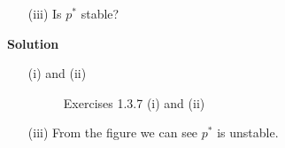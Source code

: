 \begin{enumerate}
\begin{itemize}
            \item[(iii)] Is $p^*$ stable?
        \end{itemize}
        \textbf{Solution}
        \begin{itemize}
            \item[(i) and (ii)]
                \begin{figure}[H]
                    \centering
                    \caption{Exercises 1.3.7 (i) and (ii)}
                    \label{fig:exercises-1.3.7-i&ii}
                \end{figure}
            \item[(iii)] From the figure we can see $p^*$ is unstable.
        \end{itemize}
\end{enumerate}

